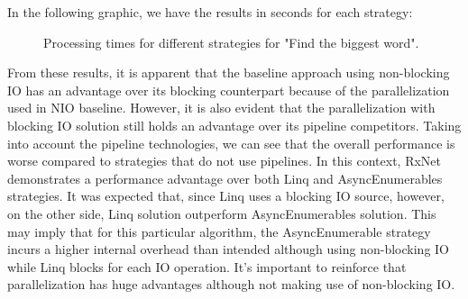 In the following graphic, we have the results in seconds for each strategy:
\begin{figure}[H]
    \centering
    \caption{Processing times for different strategies for "Find the biggest word".}
    \label{fig:biggest_word_results_cs_2}
\end{figure}

From these results, it is apparent that the baseline approach using non-blocking IO has an advantage over its blocking counterpart because of the parallelization used in NIO baseline. However, it is also evident that the parallelization with blocking IO solution still holds an advantage over its pipeline competitors.
Taking into account the pipeline technologies, we can see that the overall performance is worse compared to strategies that do not use pipelines. In this context, RxNet demonstrates a performance advantage over both Linq and AsyncEnumerables strategies. It was expected that, since Linq uses a blocking IO source, however, on the other side, Linq solution outperform AsyncEnumerables solution. This may imply that for this particular algorithm, the AsyncEnumerable strategy incurs a higher internal overhead than intended although using non-blocking IO while Linq blocks for each IO operation. 
It's important to reinforce that parallelization has huge advantages although not making use of non-blocking IO.


